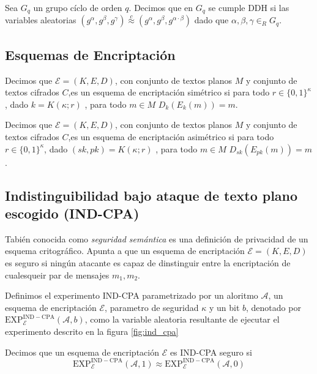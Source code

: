 \begin{definicion}[DDH]
Sea $G_q$ un grupo cíclo de orden $q$. Decimos que en $G_q$ se cumple DDH
si las variables aleatorias $(g^\alpha, g^\beta, g^\gamma) \overset{c}{\approx}
(g^\alpha, g^\beta, g^{\alpha \cdot \beta})$ dado que $\alpha, \beta, \gamma \in_R G_q$.
\end{definicion}

\subsection{Esquemas de Encriptación}
Decimos que $\mathcal{E} = (K, E, D)$, con conjunto de textos planos $M$ y conjunto de textos
cifrados $C$,es un esquema de encriptación simétrico si para todo
$r \in \{0, 1\}^\kappa$, dado $k = K(\kappa; r)$ , para todo $m\in M$ $D_k(E_k(m))=m$.

Decimos que $\mathcal{E} = (K, E, D)$, con conjunto de textos planos $M$ y conjunto de textos
cifrados $C$,es un esquema de encriptación asimétrico si para todo
$r \in \{0, 1\}^\kappa$, dado $(sk, pk) = K(\kappa; r)$ , para todo $m\in M$ $D_{sk}(E_{pk}(m))=m$.


\subsection{Indistinguibilidad bajo ataque de texto plano escogido (IND-CPA)}
Tabién conocida como \textit{seguridad semántica} es una definición de privacidad de un esquema
critográfico. Apunta a que un esquema de encriptación $\mathcal{E} = (K, E, D)$ es seguro si ningún atacante es capaz de
dinstinguir entre la encriptación de cualesqueir par de mensajes $m_1, m_2$.


\begin{definicion}
Definimos el experimento IND-CPA parametrizado por un aloritmo $\mathcal{A}$,
un esquema de encriptación $\mathcal{E}$, parametro de seguridad $\kappa$ y
un bit $b$, denotado por $\mathrm{EXP}^\mathrm{IND-CPA}_\mathcal{E}(\mathcal{A}, b)$,
como la variable aleatoria resultante de
ejecutar el experimento descrito en la figura \ref{fig:ind_cpa}
\end{definicion}


\begin{definicion}
Decimos que un esquema de encriptación $\mathcal{E}$ es IND-CPA seguro si
$$\mathrm{EXP}^\mathrm{IND-CPA}_\mathcal{E}(\mathcal{A}, 1) \approx
\mathrm{EXP}^\mathrm{IND-CPA}_\mathcal{E}(\mathcal{A}, 0)$$
\end{definicion}

